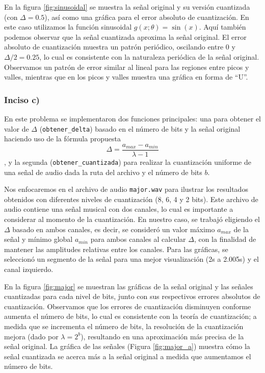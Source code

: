 \documentclass[paper=letter, fontsize=11pt, draft=false]{scrartcl}
\numberwithin{equation}{problemcounter} %
\numberwithin{figure}{problemcounter} %
\numberwithin{table}{problemcounter} %
\numberwithin{subsection}{problemcounter}
\begin{document}
En la figura \ref{fig:sinusoidal} se muestra la señal original y su versión cuantizada (con $\Delta = 0.5$), así como una gráfica para el error absoluto de cuantización. En este caso utilizamos la función sinusoidal $g(x; \theta) = \sin(x)$. Aquí también podemos observar que la señal cuantizada aproxima la señal original. El error absoluto de cuantización muestra un patrón periódico, oscilando entre 0 y $\Delta/2 = 0.25$, lo cual es consistente con la naturaleza periódica de la señal original. Observamos un patrón de error similar al lineal para las regiones entre picos y valles, mientras que en los picos y valles muestra una gráfica en forma de ``U''.





\subsubsection{Inciso c)}
En este problema se implementaron dos funciones principales: una para obtener el valor de $\Delta$ (\texttt{obtener\_delta}) basado en el número de bits y la señal original haciendo uso de la fórmula propuesta $$\Delta = \frac{a_{max}-a_{min}}{\lambda-1}$$, y la segunda (\texttt{obtener\_cuantizada}) para realizar la cuantización uniforme de una señal de audio dada la ruta del archivo y el número de bits $b$.

Nos enfocaremos en el archivo de audio \texttt{major.wav} para ilustrar los resultados obtenidos con diferentes niveles de cuantización (8, 6, 4 y 2 bits). Este archivo de audio contiene una señal musical con dos canales, lo cual es importante a considerar al momento de la cuantización. En nuestro caso, se trabajó eligiendo el $\Delta$ basado en ambos canales, es decir, se consideró un valor máximo $a_{max}$ de la señal y mínimo global $a_{min}$ para ambos canales al calcular $\Delta$, con la finalidad de mantener las amplitudes relativas entre los canales. Para las gráficas, se seleccionó un segmento de la señal para una mejor visualización (2s a 2.005s) y el canal izquierdo.

En la figura \ref{fig:major} se muestran las gráficas de la señal original y las señales cuantizadas para cada nivel de bits, junto con sus respectivos errores absolutos de cuantización. Observamos que los errores de cuantización disminuyen conforme aumenta el número de bits, lo cual es consistente con la teoría de cuantización; a medida que se incrementa el número de bits, la resolución de la cuantización mejora (dado por $\lambda = 2^b$), resultando en una aproximación más precisa de la señal original. La gráfica de las señales (Figura \ref{fig:major_a}) muestra cómo la señal cuantizada se acerca más a la señal original a medida que aumentamos el número de bits.
\end{document}
